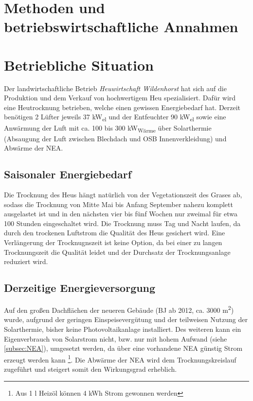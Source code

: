 \documentclass[11pt]{scrartcl}
\begin{document}
\section{Methoden und betriebswirtschaftliche Annahmen}

\section{Betriebliche Situation}
\label{sec:betrieb}

Der landwirtschaftliche Betrieb \textit{Heuwirtschaft Wildenhorst} hat sich auf die Produktion und dem Verkauf von hochwertigem Heu spezialisiert.
Dafür wird eine Heutrocknung betrieben, welche einen gewissen Energiebedarf hat.
Derzeit benötigen 2 Lüfter jeweils 37 kW\textsubscript{el} und der Entfeuchter 90 kW\textsubscript{el} sowie eine Anwärmung der Luft mit ca. 100 bis 300 kW\textsubscript{Wärme} über Solarthermie (Absaugung der Luft zwischen Blechdach und OSB Innenverkleidung) und Abwärme der \ac{NEA}.

\subsection{Saisonaler Energiebedarf}
Die Trocknung des Heus hängt natürlich von der Vegetationszeit des Grases ab, sodass die Trocknung von Mitte Mai bis Anfang September nahezu komplett ausgelastet ist und in den nächsten vier bis fünf Wochen nur zweimal für etwa 100 Stunden eingeschaltet wird.
Die Trocknung muss Tag und Nacht laufen, da durch den trockenen Luftstrom die Qualität des Heus gesichert wird.
Eine Verlängerung der Trocknugnszeit ist keine Option, da bei einer zu langen Trocknungszeit die Qualität leidet und der Durchsatz der Trocknungsanlage reduziert wird.

\subsection{Derzeitige Energieversorgung}
Auf den großen Dachflächen der neueren Gebäude (BJ ab 2012, ca. 3000 m\textsuperscript{2}) wurde, aufgrund der geringen Einspeisevergütung und der teilweisen Nutzung der Solarthermie, bisher keine Photovoltaikanlage installiert.
Des weiteren kann ein Eigenverbrauch von Solarstrom nicht, bzw. nur mit hohem Aufwand (siehe \cref{subsec:NEA}), umgesetzt werden, da über eine vorhandene \ac{NEA} günstig Strom erzeugt werden kann \footnote{Aus 1 l Heizöl können 4 kWh Strom gewonnen werden}.
Die Abwärme der \ac{NEA} wird dem Trocknungskreislauf zugeführt und steigert somit den Wirkungsgrad erheblich.
\end{document}
